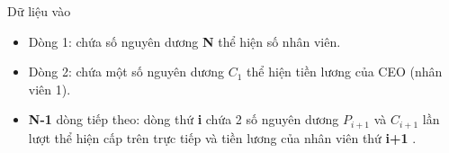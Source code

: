 Dữ liệu vào
\begin{itemize}
	\item Dòng 1: chứa số nguyên dương \textbf{ N } thể hiện số nhân viên.
	\item Dòng 2: chứa một số nguyên dương \textbf{ $C_{1}$} thể hiện tiền lương của CEO (nhân viên 1).
	\item \textbf{N-1 } dòng tiếp theo: dòng thứ \textbf{ i } chứa 2 số nguyên dương \textbf{ $P_{i+1}$} và \textbf{ $C_{i+1}$} lần lượt thể hiện cấp trên trực tiếp và tiền lương của nhân viên thứ \textbf{ i+1 } .
\end{itemize}